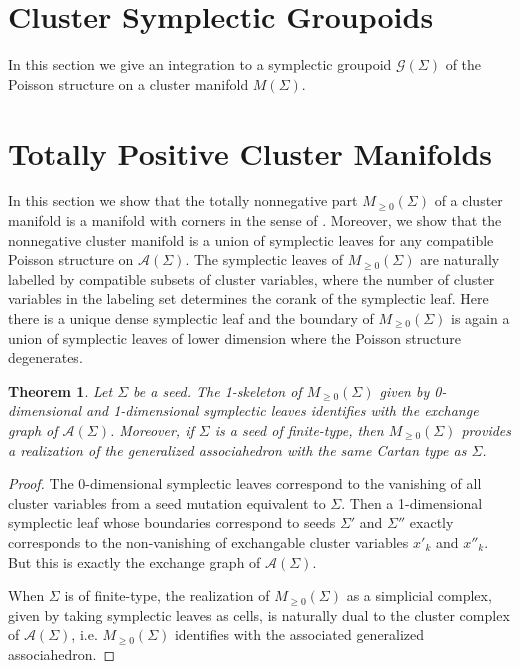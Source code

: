 \documentclass{amsart}
\newtheorem{theorem}{Theorem}[section]
\newcommand{\cA}{\mathcal{A}}
\newcommand{\cG}{\mathcal{G}}
\begin{document}
\section{Cluster Symplectic Groupoids}
In this section we give an integration to a symplectic groupoid $\cG(\Sigma)$ of the Poisson structure on a cluster manifold $M(\Sigma)$.  

\section{Totally Positive Cluster Manifolds}
In this section we show that the totally nonnegative part $M_{\ge0}(\Sigma)$ of a cluster manifold is a manifold with corners in the sense of \cite{MR3077259}.  
Moreover, we show that the nonnegative cluster manifold is a union of symplectic leaves for any compatible Poisson structure on $\cA(\Sigma)$.  
The symplectic leaves of $M_{\ge0}(\Sigma)$ are naturally labelled by compatible subsets of cluster variables, where the number of cluster variables in the labeling set determines the corank of the symplectic leaf.
Here there is a unique dense symplectic leaf and the boundary of $M_{\ge0}(\Sigma)$ is again a union of symplectic leaves of lower dimension where the Poisson structure degenerates.

\begin{theorem}
  Let $\Sigma$ be a seed.  
  The 1-skeleton of $M_{\ge0}(\Sigma)$ given by 0-dimensional and 1-dimensional symplectic leaves identifies with the exchange graph of $\cA(\Sigma)$.  
  Moreover, if $\Sigma$ is a seed of finite-type, then $M_{\ge0}(\Sigma)$ provides a realization of the generalized associahedron with the same Cartan type as $\Sigma$.
\end{theorem}
\begin{proof}
  The 0-dimensional symplectic leaves correspond to the vanishing of all cluster variables from a seed mutation equivalent to $\Sigma$.  
  Then a 1-dimensional symplectic leaf whose boundaries correspond to seeds $\Sigma'$ and $\Sigma''$ exactly corresponds to the non-vanishing of exchangable cluster variables $x'_k$ and $x''_k$.
  But this is exactly the exchange graph of $\cA(\Sigma)$.

  When $\Sigma$ is of finite-type, the realization of $M_{\ge0}(\Sigma)$ as a simplicial complex, given by taking symplectic leaves as cells, is naturally dual to the cluster complex of $\cA(\Sigma)$, i.e. $M_{\ge0}(\Sigma)$ identifies with the associated generalized associahedron.
\end{proof}
\end{document}
